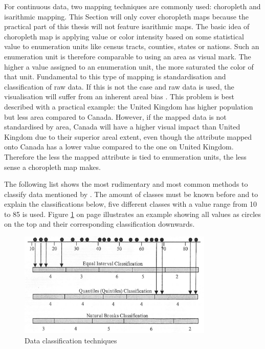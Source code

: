 For continuous data, two mapping techniques are commonly used: choropleth and isarithmic mapping. This Section will only cover choropleth maps because the practical part of this thesis will not feature isarithmic maps. The basic idea of choropleth map is applying value or color intensity based on some statistical value to enumeration units like census tracts, counties, states or nations. Such an enumeration unit is therefore comparable to using an area as visual mark. The higher a value assigned to an enumeration unit, the more saturated the color of that unit. Fundamental to this type of mapping is standardisation and classification of raw data. If this is not the case and raw data is used, the visualisation will suffer from an inherent areal bias . This problem is best described with a practical example: the United Kingdom has higher population but less area compared to Canada. However, if the mapped data is not standardised by area, Canada will have a higher visual impact than United Kingdom due to their superior areal extent, even though the attribute mapped onto Canada has a lower value compared to the one on United Kingdom. Therefore the less the mapped attribute is tied to enumeration units, the less sense a choropleth map makes.

The following list shows the most rudimentary and most common methods to classify data mentioned by \citeauthor{McMaster2010}. The amount of classes must be known before and to explain the classifications below, five different classes with a value range from 10 to 85 is used. Figure \ref{fig:choropleth-classification} on page \pageref{fig:choropleth-classification} illustrates an example showing all values as circles on the top and their corresponding classification downwards.

\begin{figure}[!htb]
\centering
\includegraphics[height=5cm,keepaspectratio]{images/choropleth/classification.png}
\caption[
    Data classification techniques .
]{Data classification techniques}
\label{fig:choropleth-classification}
\end{figure}

